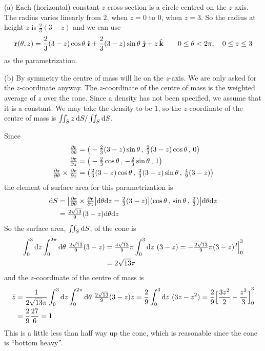 \begin{solution} (a)
Each (horizontal) constant $z$ cross-section is a circle centred on the 
$z$-axis. The radius varies linearly from $2$, when $z=0$ to $0$, when 
$z=3$. So the radius at height $z$ is $\frac{2}{3}(3-z)$ and we can use
\begin{align*}
\mathbf{r}(\theta,z) = \frac{2}{3}(3-z)\cos\theta\ \hat{\pmb{\imath}} 
                +\frac{2}{3}(3-z)\sin\theta\ \hat{\pmb{\jmath}}
                +z\,\hat{\mathbf{k}}\qquad
0\le\theta<2\pi,\quad 0\le z\le 3 
\end{align*}
as the parametrization.

\noindent (b)
By symmetry the centre of mass will lie on the $z$-axis.
We are only asked for the $z$-coordinate anyway. The $z$-coordinate
of the centre of mass is the weighted average of $z$ over the cone.
Since a density has not been specified,
we assume that it is a constant. We may take the density to be $1$, so the
$z$-coordinate of the centre of mass is $\iint_S z\,\mathrm{d}S/
\iint_S \mathrm{d}S$.

Since
\begin{align*}
\tfrac{\partial\mathbf{r}}{\partial\theta}
&=\big(-\tfrac{2}{3}(3-z)\sin\theta\,,\,
        \tfrac{2}{3}(3-z)\cos\theta\,,\,
          0 \big) \\
\tfrac{\partial\mathbf{r}}{\partial z}
&=\big(-\tfrac{2}{3}\cos\theta\,,\,
       -\tfrac{2}{3}\sin\theta\,,\,
          1 \big) \\
\tfrac{\partial\mathbf{r}}{\partial\theta} \times \tfrac{\partial\mathbf{r}}{\partial z} 
&=\big(\tfrac{2}{3}(3-z)\cos\theta\,,\,
       \tfrac{2}{3}(3-z)\sin\theta\,,\,
       \tfrac{4}{9}(3-z)\big)
\end{align*}
the element of surface area for this parametrization is
\begin{align*}
\mathrm{d}S &= 
\big|\tfrac{\partial\mathbf{r}}{\partial\theta}\times
      \tfrac{\partial\mathbf{r}}{\partial z} \big|\mathrm{d}\theta\mathrm{d}z
=\tfrac{2}{3}(3-z)\big|(\cos\theta\,,\,\sin\theta\,,\,\tfrac{2}{3}\big)\big|
    \mathrm{d}\theta\mathrm{d}z \\ 
&=\tfrac{2\sqrt{13}}{9}(3-z) \mathrm{d}\theta\mathrm{d}z
\end{align*}
So the surface area, $\iint_S \mathrm{d}S$, of the cone is
\begin{align*}
\int_0^3\mathrm{d}z\int_0^{2\pi}\mathrm{d}\theta\ \tfrac{2\sqrt{13}}{9}(3-z)
&=\tfrac{4\sqrt{13}}{9}\pi\int_0^3\mathrm{d}z\ (3-z)
=-\tfrac{2\sqrt{13}}{9}\pi(3-z)^2\Big|_0^3 \\
&=2\sqrt{13}\pi
\end{align*}
and the $z$-coordinate of the centre of mass is
\begin{align*}
\bar z
&=\frac{1}{2\sqrt{13}\pi}
  \int_0^3\mathrm{d}z\int_0^{2\pi}\mathrm{d}\theta\ \tfrac{2\sqrt{13}}{9}(3-z) z 
=\frac{2}{9}\int_0^3\mathrm{d}z\ (3z-z^2)
=\frac{2}{9}{\Big[\frac{3z^2}{2}-\frac{z^3}{3}\Big]}_0^3 \\
&=\frac{2}{9}\frac{27}{6}
=1
\end{align*}
This is a little less than half way up the cone, which is reasonable since
the cone is ``bottom heavy''.
\end{solution}


